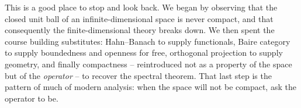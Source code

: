 \documentclass[a4paper]{scrartcl}
\begin{document}
\begin{remark}
	This is a good place to stop and look back. We began by observing that the closed unit ball of an infinite-dimensional space is never compact, and that consequently the finite-dimensional theory breaks down. We then spent the course building substitutes: Hahn--Banach to supply functionals, Baire category to supply boundedness and openness for free, orthogonal projection to supply geometry, and finally compactness -- reintroduced not as a property of the space but of the \emph{operator} -- to recover the spectral theorem. That last step is the pattern of much of modern analysis: when the space will not be compact, ask the operator to be.
\end{remark}
\end{document}
